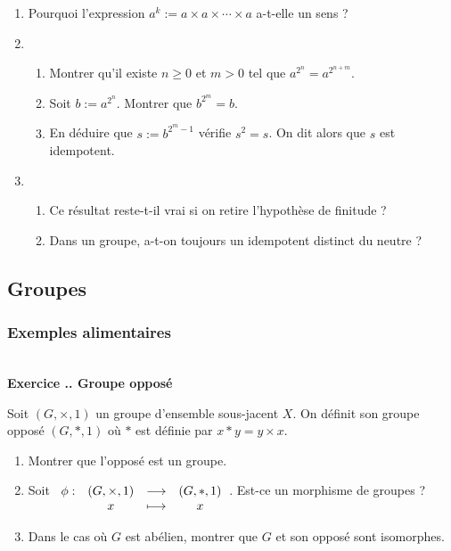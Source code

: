 \documentclass{article}
\newcommand{\fonction}[5]{\raisebox{-0.5\baselineskip}{$\begin{array}{lccc}
    #1: & #2 & \longrightarrow & #3 \\
        & #4 & \longmapsto & #5 \end{array}$}}
\newcounter{exo}
\newcommand{\exercice}[1][\null]{\textbf{\\ Exercice \thesection.\theexo. #1} \addtocounter{exo}{1}}
\begin{document}
\begin{enumerate}

\item Pourquoi l'expression $a^k := a \times a \times \cdots \times a$ a-t-elle un sens ?

\item \begin{enumerate} \item Montrer qu'il existe $n \ge 0 $ et $m > 0$ tel que $a^{2^n} = a^{2^{n+m}}$.

\item Soit $b := a^{2^{n}}$. Montrer que $b^{2^{m}} = b$. 

\item En déduire que $s := b^{2^{m}-1}$ vérifie $s^2 = s$. On dit alors que $s$ est idempotent.

\end{enumerate}

\item \begin{enumerate}

\item Ce résultat reste-t-il vrai si on retire l'hypothèse de finitude ?

\item Dans un groupe, a-t-on toujours un idempotent distinct du neutre ?

\end{enumerate}

\end{enumerate}

\subsection{Groupes}

\subsubsection{Exemples alimentaires}

\exercice[Groupe opposé]

Soit $(G, \times, 1)$ un groupe d'ensemble sous-jacent $X$. On définit son groupe opposé $(G, *, 1)$ où $*$ est définie par $x*y = y \times x$.


\begin{enumerate}

\item  Montrer que l'opposé est un groupe.

\item Soit $\fonction{\phi}{(G, \times, 1)}{(G, *, 1)}{x}{x}$. Est-ce un morphisme de groupes ?

\item Dans le cas où $G$ est abélien, montrer que $G$ et son opposé sont isomorphes.
\end{enumerate}
\end{document}
